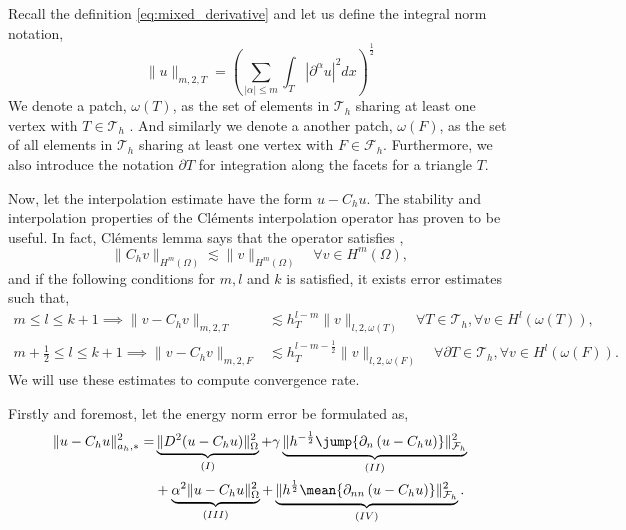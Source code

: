 Recall the definition \eqref{eq:mixed_derivative} and let us define the integral norm notation,
\[
\| u \|_{ m,2,T }^{  } = \left( \sum_{ \left\lvert \alpha  \right\rvert \le m}^{} \int_{T}^{}  \left\lvert  \partial ^{\alpha } u \right\rvert^{2} dx   \right)^{\frac{1}{2}}
\]
We denote a patch, $\omega \left( T \right) $, as the set of elements in $\mathcal{T} _{h}$  sharing at least one vertex with $T \in \mathcal{T} _{h}$ . And similarly we denote a another patch, $\omega \left( F \right) $, as the set of all elements in $\mathcal{T}_{h} $
sharing at least one vertex with $F \in  \mathcal{F} _{h}$.
Furthermore, we also introduce the notation $\partial T$ for integration along the facets for a triangle $T$.

Now, let the interpolation estimate have the form $u - C_{h}u$.
The stability and interpolation properties of the Cléments interpolation operator has proven to be useful. In fact, Cléments lemma says that the operator satisfies \cite{ern04},
\[
 \| C_{h} v \|_{H^{m}\left( \Omega  \right)   }^{  } \lesssim \| v \|_{ H^{m}\left( \Omega  \right)  }^{  } \quad \forall v \in H^{m}\left( \Omega  \right),
\]
and if the following conditions for $m,l$ and $k$ is satisfied, it exists error estimates such that,
\[
    \begin{split}
      m\le l \le k+1  \implies \| v - C_{h} v \|_{ m,2,T   }^{  }  &  \lesssim h^{l-m}_{T} \| v \|_{l,2,\omega \left( T \right)  }^{  } \quad  \forall T \in \mathcal{T} _{h}, \forall v \in H^{l}\left( \omega \left( T \right)
      \right), \\
      m +\frac{1}{2}\le l \le k+1  \implies \| v - C_{h} v \|_{ m,2,F }^{  } & \lesssim h^{l-m- \frac{1}{2}}_{T} \| v \|_{l,2,\omega \left( F \right)  }^{  } \quad  \forall \partial T \in \mathcal{T} _{h}, \forall v \in H^{l}\left( \omega \left( F
      \right)  \right).
    \end{split}
\]
We will use these estimates to compute convergence rate.

Firstly and foremost, let the energy norm error be formulated as, \[
    \begin{split}
\| u - C_{h}u \|_{ a_{h},* }^{ 2 }  =&  \underbrace{\| D^2( u - C_{h}u ) \|_{\Omega   }^{2  }}_{(I)}  + \gamma \underbrace{\| h^{-\frac{1}{2}} \jump{ \partial _{n}\left( u - C_{h}u \right)  }    \|_{ \mathcal{F} _{h}  }^{2  }}_{(II)} \\
& +  \underbrace{\alpha ^2 \| u - C_{h}u \|_{\Omega   }^{2}}_{(III)}  + \underbrace{\| h^{\frac{1}{2}} \mean{ \partial _{nn}\left(  u - C_{h}u\right)  }   \|_{\mathcal{F} _{h}  }^{ 2 }}_{(IV)}.
    \end{split}
\]


